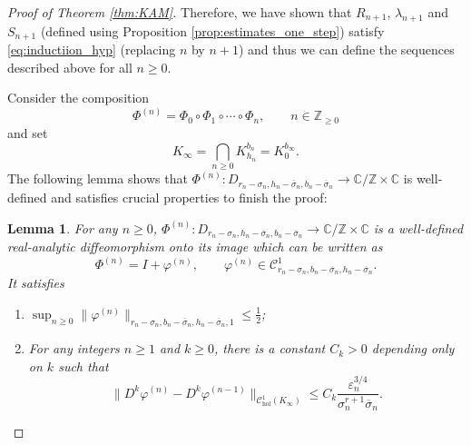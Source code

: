 \documentclass[10pt,a4paper]{amsart}
\newtheorem{lemma}{Lemma}
\newcommand{\C}{\mathbb{C}}
\newcommand{\Domain}[3]{D_{#1, #2, #3}}
\newcommand{\Z}{\mathbb{Z}}
\begin{document}
\begin{proof}[Proof of Theorem \ref{thm:KAM}]
Therefore, we have shown that $R_{n + 1}$, $\lambda_{n + 1}$ and $S_{n + 1}$ (defined using Proposition \ref{prop:estimates_one_step}) satisfy \eqref{eq:inductiion_hyp} (replacing $n$ by $n + 1$) and thus we can define the sequences described above for all $n \geq 0$.

\vspace{0.2cm}
Consider the composition
\[
\Phi^{(n)} = \Phi_0\circ\Phi_1\circ\cdots\circ\Phi_n,
\qquad n\in\Z_{\geq 0}
\]
and set 
\[
K_{\infty} = \bigcap_{n\geq 0} K_{h_n}^{b_n} = K_0^{b_\infty}.
\]
The following lemma shows that $\Phi^{(n)}:\Domain{r_n-\sigma_n}{h_n-\overline\sigma_n}{b_n-\overline\sigma_n}\to\C/\Z\times\C$ is well-defined and satisfies crucial properties to finish the proof:
\begin{lemma}
    \label{lemma:composition_diffeos}
    For any $n\geq 0$, $\Phi^{(n)}:\Domain{r_n-\sigma_n}{h_n-\overline\sigma_n}{b_n-\overline\sigma_n} \to\C/\Z\times \C$ is a well-defined real-analytic diffeomorphism onto its image which  can be written as
    \[
    \Phi^{(n)} = I + \varphi^{(n)},
    \qquad \varphi^{(n)} \in\mathscr C^1_{r_n-\sigma_n, b_n-\overline\sigma_n, h_n-\overline\sigma_n}.
    \]
    It satisfies
    \begin{enumerate}
        \item $\sup_{n\geq 0} \|\varphi^{(n)}\|_{r_n-\sigma_n, b_n-\overline\sigma_n, h_n-\overline\sigma_n,1}\leq \frac{1}{2}$;
        \item For any integers $n\geq 1$ and $k\geq 0$, there is a constant $C_k>0$ depending only on $k$ such that
        \[
        \|D^k\varphi^{(n)}-D^k\varphi^{(n-1)}\|_{\mathscr C^1_{\text{{hol}}}(K_{\infty})}
        \leq
        C_k\frac{\varepsilon_n^{3/4}}{\sigma_n^{r+1}\overline\sigma_n}.
        \]
    \end{enumerate}
\end{lemma}


\end{proof}
\end{document}
